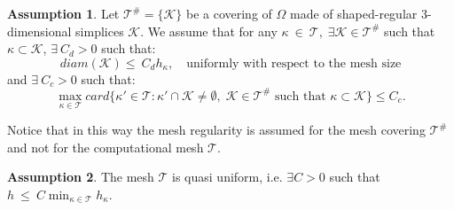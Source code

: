 \documentclass[12pt, a4paper]{article}
\theoremstyle{definition}
\newtheorem{ipotesi}{Assumption}
\theoremstyle{plain}
\theoremstyle{plain}
\begin{document}
\begin{ipotesi} \label{ipo:ipo4}
	Let $\mathcal{T}^\# = \{ \mathcal{K} \}$ be a covering of $\Omega$ made of shaped-regular $3$-dimensional simplices $\mathcal{K}$. We assume that for any $\kappa~\in~\mathcal{T}, \; \exists\mathcal{K}\in\mathcal{T}^\# $ such that $\kappa\subset\mathcal{K}$, $\exists~C_d>0$ such that:
	\begin{equation*}
		diam(\mathcal{K})\leq~C_dh_\kappa, \quad \text{uniformly with respect to the mesh size}
	\end{equation*}
	and $\exists~C_c>0$ such that:
	\begin{equation*}
		\max\limits_{\kappa \in \mathcal{T}} card \big\{ \kappa' \in \mathcal{T} : \kappa' \cap \mathcal{K} \ne \emptyset, \; \mathcal{K} \in \mathcal{T}^\# \text{ such that } \kappa \subset \mathcal{K} \big\} \leq C_c.
	\end{equation*}
\end{ipotesi}
Notice that in this way the mesh regularity is assumed for the mesh covering $\mathcal{T}^\#$ and not for the computational mesh $\mathcal{T}$.
\begin{ipotesi} \label{ipo:ipo5}
	The mesh $\mathcal{T}$ is quasi uniform, i.e. $\exists C>0$ such that $h~\leq~C \min_{\kappa \in \mathcal{T}} h_\kappa$.
\end{ipotesi}
\end{document}
